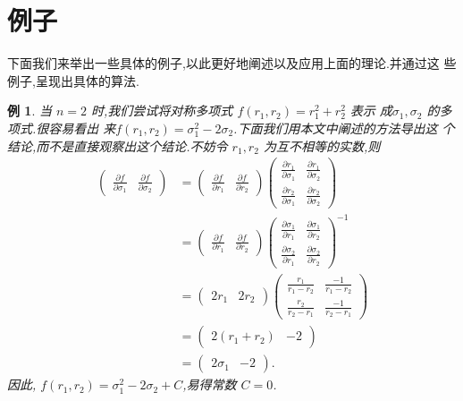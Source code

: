 \documentclass[a4paper]{article}
\newtheorem{example}{例}[section]
\newcommand{\pa}{\partial} \newcommand{\Om}{\Omega}
\begin{document}
\section{例子}
\label{sec:3}
下面我们来举出一些具体的例子,以此更好地阐述以及应用上面的理论.并通过这
些例子,呈现出具体的算法.
\begin{example}
  当 $n=2$ 时,我们尝试将对称多项式 $f(r_1,r_2)=r_1^2+r_2^2$ 表示
  成$\sigma_1,\sigma_2$ 的多项式.很容易看出
  来$f(r_1,r_2)=\sigma_1^2-2\sigma_2$.下面我们用本文中阐述的方法导出这
  个结论,而不是直接观察出这个结论.不妨令 $r_1,r_2$ 为互不相等的实数,则
\begin{align*}
\begin{pmatrix}
  \frac{\pa f}{\pa \sigma_1}&\frac{\pa f}{\pa \sigma_2}
\end{pmatrix}&=\begin{pmatrix}
\frac{\pa f}{\pa r_1}&\frac{\pa f}{\pa r_2}
\end{pmatrix}\begin{pmatrix}
  \frac{\pa r_1}{\pa \sigma_1}&\frac{\pa r_1}{\pa \sigma_2}\\
\frac{\pa r_2}{\pa \sigma_1}&\frac{\pa r_2}{\pa \sigma_{2}}
\end{pmatrix}\\&=\begin{pmatrix}
  \frac{\pa f}{\pa r_1}&\frac{\pa f}{\pa r_2}
\end{pmatrix}\begin{pmatrix}
  \frac{\pa \sigma_1}{\pa r_1}&\frac{\pa\sigma_1}{\pa r_2}\\
\frac{\pa \sigma_2}{\pa r_1}&\frac{\pa\sigma_2}{\pa r_2}
\end{pmatrix}^{-1}\\&=\begin{pmatrix}
  2r_1&2r_2
\end{pmatrix}\begin{pmatrix}
  \frac{r_1}{r_1-r_2}&\frac{-1}{r_1-r_2}\\
\frac{r_2}{r_2-r_1}&\frac{-1}{r_2-r_1}
\end{pmatrix}\\&=\begin{pmatrix}
  2(r_1+r_2)&-2
\end{pmatrix}\\&=\begin{pmatrix}
  2\sigma_1&-2
\end{pmatrix}.
\end{align*}
因此, $f(r_1,r_2)=\sigma_1^2-2\sigma_2+C$,易得常数 $C=0$.
\end{example}
\end{document}

